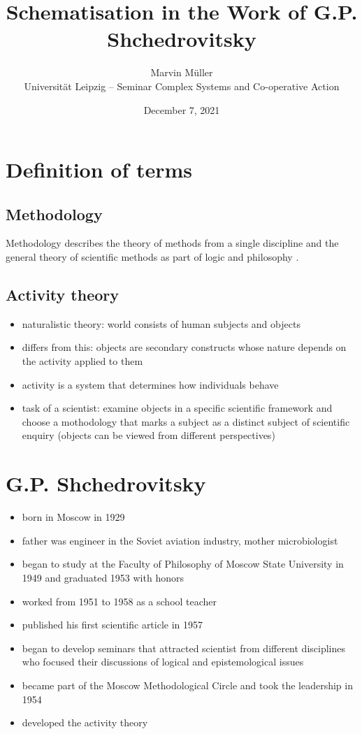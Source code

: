 \documentclass[a4paper,11pt]{article}
\title{Schematisation in the Work of G.P. Shchedrovitsky}
\author{Marvin Müller\\[.3cm] Universität Leipzig -- Seminar Complex Systems
  and Co-operative Action }
\date{December 7, 2021}
\begin{document}
\maketitle

\section{Definition of terms}
\subsection{Methodology}
Methodology describes the theory of methods from a single discipline and the
general theory of scientific methods as part of logic and philosophy \cite{2}.

\subsection{Activity theory}
\begin{itemize}
\item naturalistic theory: world consists of human subjects and objects
\item differs from this: objects are secondary constructs whose nature depends
  on the activity applied to them
\item activity is a system that determines how individuals behave
\item task of a scientist: examine objects in a specific scientific framework
  and choose a mothodology that marks a subject as a distinct subject of
  scientific enquiry (objects can be viewed from different perspectives)
  \cite{1}
\end{itemize}

\section{G.P. Shchedrovitsky}

\begin{itemize}
\item born in Moscow in 1929
\item father was engineer in the Soviet aviation industry, mother
  microbiologist
\item began to study at the Faculty of Philosophy of Moscow State University
  in 1949 and graduated 1953 with honors
\item worked from 1951 to 1958 as a school teacher
\item published his first scientific article in 1957
\item began to develop seminars that attracted scientist from different
  disciplines who focused their discussions of logical and epistemological
  issues
\item became part of the Moscow Methodological Circle and took the leadership
  in 1954
\item developed the activity theory \cite{1}
\end{itemize}
\end{document}

